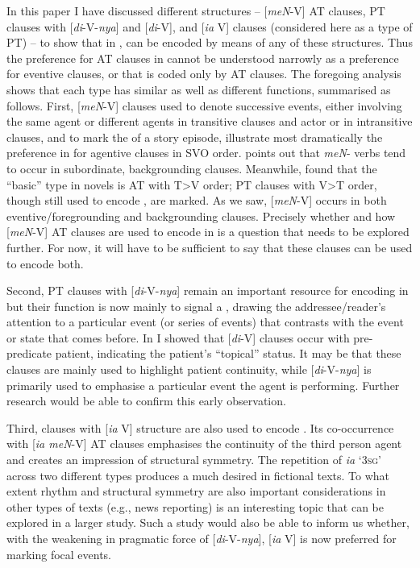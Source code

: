 \documentclass[output=paper
,modfonts
,nonflat]{langsci/langscibook}
\begin{document}
In this paper I have discussed different  structures – [\textit{meN}-V] AT clauses, PT clauses with [\textit{di}-V-\textit{nya}] and [\textit{di}-V], and [\textit{ia} V]  clauses (considered here as a type of PT) – to show that in ,  can be encoded by means of any of these structures. Thus the preference for AT clauses in  cannot be understood narrowly as a preference for eventive clauses, or that  is coded only by AT clauses. The foregoing analysis shows that each  type has similar as well as different functions, summarised as follows. First, [\textit{meN}-V] clauses used to denote successive events, either involving the same agent or different agents in transitive clauses and actor or  in intransitive clauses, and to mark the  of a story episode, illustrate most dramatically the preference in  for agentive clauses in SVO order. \citet[226]{Kaswanti1988} points out that \textit{meN}- verbs tend to occur in subordinate, backgrounding clauses. Meanwhile, \citet[203]{Cumming1991} found that the “basic”  type in  novels is AT with T>V order; PT clauses with V>T order, though still used to encode , are marked. As we saw, [\textit{meN}-V] occurs in both eventive/foregrounding and backgrounding clauses. Precisely whether and how [\textit{meN}-V] AT clauses are used to encode  in  is a question that needs to be explored further. For now, it will have to be sufficient to say that these clauses can be used to encode both.

Second, PT clauses with [\textit{di}-V-\textit{nya}] remain an important resource for encoding  in  but their function is now mainly to signal a , drawing the addressee/reader’s attention to a particular event (or series of events) that contrasts with the event or state that comes before. In  I showed that [\textit{di}-V] clauses occur with pre-predicate patient, indicating the patient’s “topical” status. It may be that these clauses are mainly used to highlight patient continuity, while [\textit{di}-V-\textit{nya}] is primarily used to emphasise a particular event the agent is performing. Further research would be able to confirm this early observation. 

Third,  clauses with [\textit{ia} V] structure are also used to encode . Its co-occurrence with [\textit{ia meN}-V] AT clauses emphasises the continuity of the third person agent and creates an impression of structural symmetry. The repetition of \textit{ia} ‘3\textsc{sg}’ across two different  types produces a  much desired in fictional texts. To what extent rhythm and structural symmetry are also important considerations in other types of texts (e.g., news reporting) is an interesting topic that can be explored in a larger study. Such a study would also be able to inform us whether, with the weakening in pragmatic force of [\textit{di}-V-\textit{nya}], [\textit{ia} V] is now preferred for marking focal events.
\end{document}
